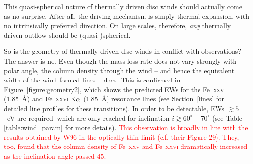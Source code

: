 \documentclass[a4paper,fleqn,usenatbib]{mnras}
\begin{document}
This quasi-spherical nature of thermally driven disc winds should
actually come as no surprise. After all, the driving mechanism is
simply thermal expansion, with no intrinsically preferred
direction. On large scales, therefore, {\em any} thermally driven
outflow should be (quasi-)spherical.

So is the geometry of thermally driven disc winds in conflict with
observations? The answer is no. Even though the mass-loss rate
does not vary strongly with polar angle, the column density
through the wind -- and hence the equivalent width of the
wind-formed lines -- does. This is confirmed in
Figure~\ref{figure:geometry2}, which shows the predicted EWs for the
Fe~\textsc{xxv} (1.85~{\AA}) and Fe~\textsc{xxvi} K$\rm{\alpha}$
(1.85~{\AA}) resonance lines (see Section~\ref{lines} for detailed
line profiles for these transitions). In order to be detectable, EWs
$\gtrsim 5$~eV are required, which are only reached for inclination
$i \gtrsim 60^\circ - 70^\circ$ (see Table \ref{table:wind_param} for
more details). \textcolor{red}{This observation is broadly in line with 
the results obtained by W96 in the optically thin limit (c.f. their Figure
29). They, too, found that
the column density of Fe~\textsc{xxv} and Fe~\textsc{xxvi} dramatically 
increased as the inclination angle passed 45\degree.}
\end{document}
